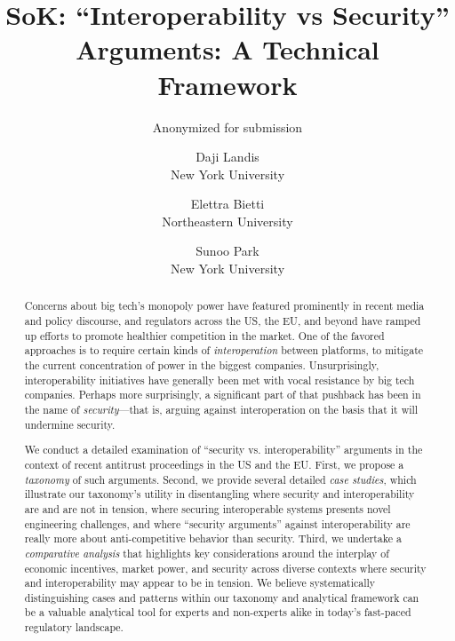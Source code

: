\documentclass[letterpaper,twocolumn,10pt]{article}
\begin{document}
\date{}


\title{\Large \bf {SoK}: ``Interoperability vs Security'' Arguments: A Technical Framework}


\ifanon
    \author{Anonymized for submission}
\else
    \author{
    {\rm Daji Landis}\\
    New York University
    \and
    {\rm Elettra Bietti}\\
    Northeastern University
    \and
    {\rm Sunoo Park}\\
    New York University
    } 
\fi

\maketitle

\begin{abstract}
Concerns about big tech's monopoly power have featured prominently in recent media and policy discourse, and regulators across the US, the EU, and beyond have ramped up efforts to promote healthier competition in the market. One of the favored approaches is to require certain kinds of \emph{interoperation} between platforms, to mitigate the current concentration of power in the biggest companies.
Unsurprisingly, interoperability initiatives have generally been met with vocal resistance by big tech companies. Perhaps more surprisingly, a significant part of that pushback has been in the name of \emph{security}---that is, arguing against interoperation on the basis that it will undermine security.

We conduct a detailed examination of ``security vs. interoperability'' arguments in the context of recent antitrust proceedings in the US and the EU. First, we propose a \emph{taxonomy} of such arguments. Second, we provide several detailed \emph{case studies}, which illustrate our taxonomy's utility in disentangling where security and interoperability are and are not in tension, where securing interoperable systems presents novel engineering challenges, and where ``security arguments'' against interoperability are really more about anti-competitive behavior than security. Third, we undertake a \emph{comparative analysis} that highlights key considerations around the interplay of economic incentives, market power, and security across diverse contexts where security and interoperability may appear to be in tension.
We believe systematically distinguishing cases and patterns within our taxonomy and analytical framework can be a valuable analytical tool for experts and non-experts alike in today's fast-paced regulatory landscape.


\end{abstract}
\end{document}
